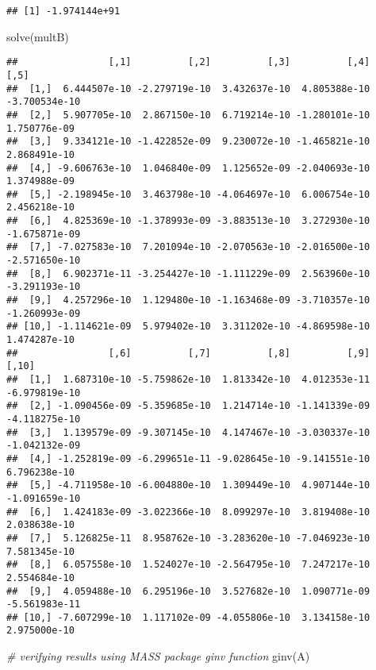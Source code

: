\documentclass[
]{article}
\newenvironment{Shaded}{\begin{snugshade}}{\end{snugshade}}
\newcommand{\CommentTok}[1]{\textcolor[rgb]{0.56,0.35,0.01}{\textit{#1}}}
\newcommand{\FunctionTok}[1]{\textcolor[rgb]{0.00,0.00,0.00}{#1}}
\newcommand{\NormalTok}[1]{#1}
\begin{document}
\begin{verbatim}
## [1] -1.974144e+91
\end{verbatim}

\begin{Shaded}
\begin{Highlighting}[]
\FunctionTok{solve}\NormalTok{(multB)}
\end{Highlighting}
\end{Shaded}

\begin{verbatim}
##                [,1]          [,2]          [,3]          [,4]          [,5]
##  [1,]  6.444507e-10 -2.279719e-10  3.432637e-10  4.805388e-10 -3.700534e-10
##  [2,]  5.907705e-10  2.867150e-10  6.719214e-10 -1.280101e-10  1.750776e-09
##  [3,]  9.334121e-10 -1.422852e-09  9.230072e-10 -1.465821e-10  2.868491e-10
##  [4,] -9.606763e-10  1.046840e-09  1.125652e-09 -2.040693e-10  1.374988e-09
##  [5,] -2.198945e-10  3.463798e-10 -4.064697e-10  6.006754e-10  2.456218e-10
##  [6,]  4.825369e-10 -1.378993e-09 -3.883513e-10  3.272930e-10 -1.675871e-09
##  [7,] -7.027583e-10  7.201094e-10 -2.070563e-10 -2.016500e-10 -2.571650e-10
##  [8,]  6.902371e-11 -3.254427e-10 -1.111229e-09  2.563960e-10 -3.291193e-10
##  [9,]  4.257296e-10  1.129480e-10 -1.163468e-09 -3.710357e-10 -1.260993e-09
## [10,] -1.114621e-09  5.979402e-10  3.311202e-10 -4.869598e-10  1.474287e-10
##                [,6]          [,7]          [,8]          [,9]         [,10]
##  [1,]  1.687310e-10 -5.759862e-10  1.813342e-10  4.012353e-11 -6.979819e-10
##  [2,] -1.090456e-09 -5.359685e-10  1.214714e-10 -1.141339e-09 -4.118275e-10
##  [3,]  1.139579e-09 -9.307145e-10  4.147467e-10 -3.030337e-10 -1.042132e-09
##  [4,] -1.252819e-09 -6.299651e-11 -9.028645e-10 -9.141551e-10  6.796238e-10
##  [5,] -4.711958e-10 -6.004880e-10  1.309449e-10  4.907144e-10 -1.091659e-10
##  [6,]  1.424183e-09 -3.022366e-10  8.099297e-10  3.819408e-10  2.038638e-10
##  [7,]  5.126825e-11  8.958762e-10 -3.283620e-10 -7.046923e-10  7.581345e-10
##  [8,]  6.057558e-10  1.524027e-10 -2.564795e-10  7.247217e-10  2.554684e-10
##  [9,]  4.059488e-10  6.295196e-10  3.527682e-10  1.090771e-09 -5.561983e-11
## [10,] -7.607299e-10  1.117102e-09 -4.055806e-10  3.134158e-10  2.975000e-10
\end{verbatim}

\begin{Shaded}
\begin{Highlighting}[]
\CommentTok{\# verifying results using MASS package \textquotesingle{}ginv\textquotesingle{} function}
\FunctionTok{ginv}\NormalTok{(A)}
\end{Highlighting}
\end{Shaded}
\end{document}
